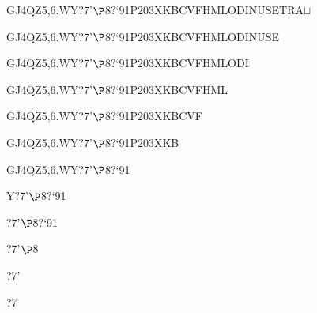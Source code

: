 \documentclass[12pt]{article}
\begin{document}
\begin{tt}
\begin{small}
\begin{bundle}{}
{\begin{bundle}{GJ4QZ5,6.WY?7'$\P$8?`91P203XKBCVFHMLODINUSETRA$\sqcup$}
{\begin{bundle}{GJ4QZ5,6.WY?7'$\P$8?`91P203XKBCVFHMLODINUSE}
{\begin{bundle}{GJ4QZ5,6.WY?7'$\P$8?`91P203XKBCVFHMLODI}
{\begin{bundle}{GJ4QZ5,6.WY?7'$\P$8?`91P203XKBCVFHML}
{\begin{bundle}{GJ4QZ5,6.WY?7'$\P$8?`91P203XKBCVF}
{\begin{bundle}{GJ4QZ5,6.WY?7'$\P$8?`91P203XKB}
{\begin{bundle}{GJ4QZ5,6.WY?7'$\P$8?`91}
{\begin{bundle}{Y?7'$\P$8?`91}
{\begin{bundle}{?7'$\P$8?`91}
{\begin{bundle}{?7'$\P$8}
{\begin{bundle}{?7'}
{\begin{bundle}{?7}
\end{bundle}}
\end{bundle}}
\end{bundle}}
\end{bundle}}
\end{bundle}}
\end{bundle}}
\end{bundle}}
\end{bundle}}
\end{bundle}}
\end{bundle}}
\end{bundle}}
\end{bundle}}
\end{bundle}
\end{small}
\end{tt}
\end{document}
